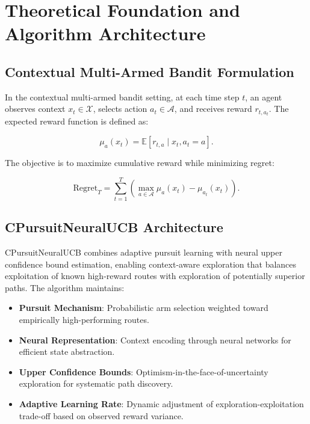 \documentclass[12pt,a4paper]{article}
\begin{document}
\section{Theoretical Foundation and Algorithm Architecture}

\subsection{Contextual Multi-Armed Bandit Formulation}

In the contextual multi-armed bandit setting, at each time step $t$, an agent observes context $x_t \in \mathcal{X}$, selects action $a_t \in \mathcal{A}$, and receives reward $r_{t,a_t}$. The expected reward function is defined as:

\begin{equation}
\mu_a(x_t) = \mathbb{E}[r_{t,a} \mid x_t, a_t = a].
\end{equation}

The objective is to maximize cumulative reward while minimizing regret:

\begin{equation}
\text{Regret}_T = \sum_{t=1}^{T} \left(\max_{a \in \mathcal{A}} \mu_a(x_t) - \mu_{a_t}(x_t)\right).
\end{equation}

\subsection{CPursuitNeuralUCB Architecture}

CPursuitNeuralUCB combines adaptive pursuit learning with neural upper confidence bound estimation, enabling context-aware exploration that balances exploitation of known high-reward routes with exploration of potentially superior paths. The algorithm maintains:

\begin{itemize}
    \item \textbf{Pursuit Mechanism}: Probabilistic arm selection weighted toward empirically high-performing routes.
    \item \textbf{Neural Representation}: Context encoding through neural networks for efficient state abstraction.
    \item \textbf{Upper Confidence Bounds}: Optimism-in-the-face-of-uncertainty exploration for systematic path discovery.
    \item \textbf{Adaptive Learning Rate}: Dynamic adjustment of exploration-exploitation trade-off based on observed reward variance.
\end{itemize}
\end{document}
